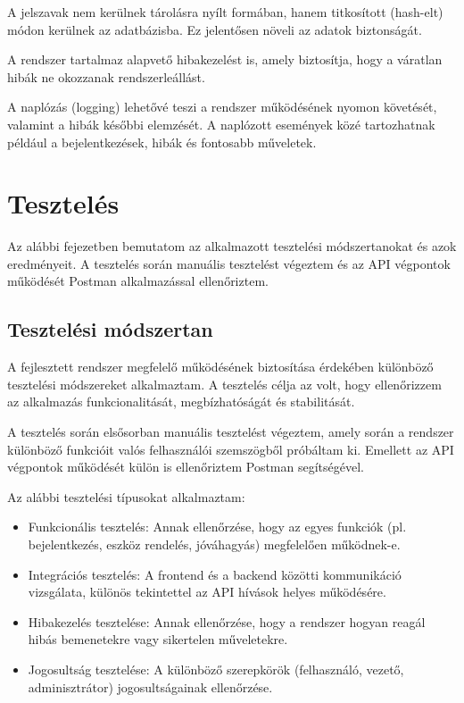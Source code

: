 \documentclass[
]{thesis-ekf}
\theoremstyle{definition}
\theoremstyle{remark}
\begin{document}
A jelszavak nem kerülnek tárolásra nyílt formában, hanem titkosított (hash-elt) módon kerülnek az adatbázisba. Ez jelentősen növeli az adatok biztonságát.

A rendszer tartalmaz alapvető hibakezelést is, amely biztosítja, hogy a váratlan hibák ne okozzanak rendszerleállást.

A naplózás (logging) lehetővé teszi a rendszer működésének nyomon követését, valamint a hibák későbbi elemzését. A naplózott események közé tartozhatnak például a bejelentkezések, hibák és fontosabb műveletek.

\chapter{Tesztelés}

Az alábbi fejezetben bemutatom az alkalmazott tesztelési módszertanokat és azok eredményeit.
A tesztelés során manuális tesztelést végeztem és az API végpontok működését Postman alkalmazással ellenőriztem.


\section{Tesztelési módszertan}
A fejlesztett rendszer megfelelő működésének biztosítása érdekében különböző tesztelési módszereket alkalmaztam. A tesztelés célja az volt, hogy ellenőrizzem az alkalmazás funkcionalitását, megbízhatóságát és stabilitását.

A tesztelés során elsősorban manuális tesztelést végeztem, amely során a rendszer különböző funkcióit valós felhasználói szemszögből próbáltam ki. Emellett az API végpontok működését külön is ellenőriztem Postman segítségével.

Az alábbi tesztelési típusokat alkalmaztam:

\begin{itemize}
	\item Funkcionális tesztelés:
	Annak ellenőrzése, hogy az egyes funkciók (pl. bejelentkezés, eszköz rendelés, jóváhagyás) megfelelően működnek-e.
	\item Integrációs tesztelés:
	A frontend és a backend közötti kommunikáció vizsgálata, különös tekintettel az API hívások helyes működésére.
	\item Hibakezelés tesztelése:
	Annak ellenőrzése, hogy a rendszer hogyan reagál hibás bemenetekre vagy sikertelen műveletekre.
	\item Jogosultság tesztelése:
	A különböző szerepkörök (felhasználó, vezető, adminisztrátor) jogosultságainak ellenőrzése.
\end{itemize}
\end{document}
